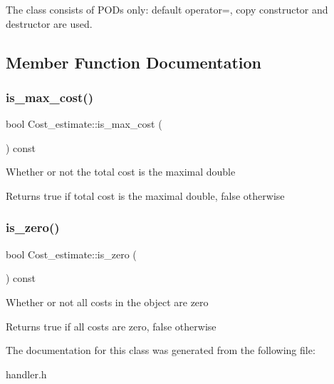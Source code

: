 The class consists of P\+O\+Ds only\+: default operator=, copy constructor and destructor are used. 

\subsection{Member Function Documentation}
\mbox{\label{classCost__estimate_a7fd206eab066d970cc3ebc8e17753a4f}} 
\subsubsection{\texorpdfstring{is\+\_\+max\+\_\+cost()}{is\_max\_cost()}}
{\footnotesize\ttfamily bool Cost\+\_\+estimate\+::is\+\_\+max\+\_\+cost (\begin{DoxyParamCaption}{ }\end{DoxyParamCaption}) const\hspace{0.3cm}{\ttfamily [inline]}}

Whether or not the total cost is the maximal double

\begin{DoxyReturn}{Returns}
true if total cost is the maximal double, false otherwise 
\end{DoxyReturn}
\mbox{\label{classCost__estimate_ad833785551022bb3aa4efe72a463d4ec}} 
\subsubsection{\texorpdfstring{is\+\_\+zero()}{is\_zero()}}
{\footnotesize\ttfamily bool Cost\+\_\+estimate\+::is\+\_\+zero (\begin{DoxyParamCaption}{ }\end{DoxyParamCaption}) const\hspace{0.3cm}{\ttfamily [inline]}}

Whether or not all costs in the object are zero

\begin{DoxyReturn}{Returns}
true if all costs are zero, false otherwise 
\end{DoxyReturn}


The documentation for this class was generated from the following file\+:\begin{DoxyCompactItemize}
\item 
handler.\+h\end{DoxyCompactItemize}
